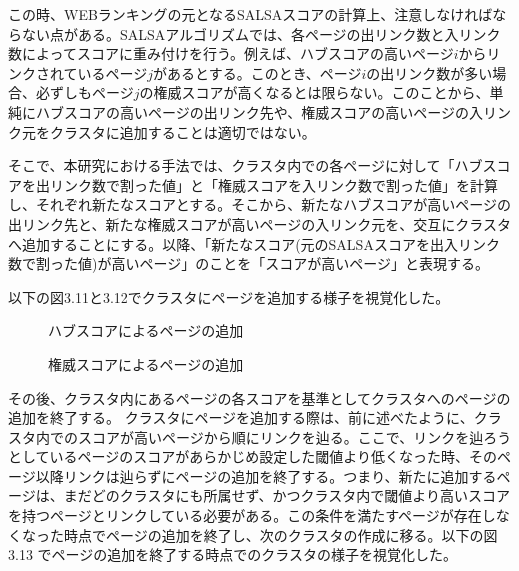 \documentclass[a4paper,11pt]{jreport}
\begin{document}
この時、WEBランキングの元となるSALSAスコアの計算上、注意しなければならない点がある。SALSAアルゴリズムでは、各ページの出リンク数と入リンク数によってスコアに重み付けを行う。例えば、ハブスコアの高いページ$i$からリンクされているページ$j$があるとする。このとき、ページ$i$の出リンク数が多い場合、必ずしもページ$j$の権威スコアが高くなるとは限らない。このことから、単純にハブスコアの高いページの出リンク先や、権威スコアの高いページの入リンク元をクラスタに追加することは適切ではない。

そこで、本研究における手法では、クラスタ内での各ページに対して「ハブスコアを出リンク数で割った値」と「権威スコアを入リンク数で割った値」を計算し、それぞれ新たなスコアとする。そこから、新たなハブスコアが高いページの出リンク先と、新たな権威スコアが高いページの入リンク元を、交互にクラスタへ追加することにする。以降、「新たなスコア(元のSALSAスコアを出入リンク数で割った値)が高いページ」のことを「スコアが高いページ」と表現する。

以下の図3.11と3.12でクラスタにページを追加する様子を視覚化した。

\begin{figure}[htbp]
\begin{center}
\end{center}
\caption{ハブスコアによるページの追加}
\label{figure:sample}
\end{figure}

\begin{figure}[htbp]
\begin{center}
\end{center}
\caption{権威スコアによるページの追加}
\label{figure:sample}
\end{figure}

その後、クラスタ内にあるページの各スコアを基準としてクラスタへのページの追加を終了する。
クラスタにページを追加する際は、前に述べたように、クラスタ内でのスコアが高いページから順にリンクを辿る。ここで、リンクを辿ろうとしているページのスコアがあらかじめ設定した閾値より低くなった時、そのページ以降リンクは辿らずにページの追加を終了する。つまり、新たに追加するページは、まだどのクラスタにも所属せず、かつクラスタ内で閾値より高いスコアを持つページとリンクしている必要がある。この条件を満たすページが存在しなくなった時点でページの追加を終了し、次のクラスタの作成に移る。以下の図3.13 でページの追加を終了する時点でのクラスタの様子を視覚化した。
\end{document}
